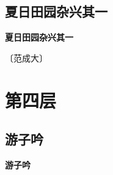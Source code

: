 \documentclass[12pt,UTF-8,openany,fontset=none]{ctexbook}
\begin{document}
\vspace{8pt}
\clearpage


\section{夏日田园杂兴其一}



\begin{center}
    {\bfseries 夏日田园杂兴其一}
\end{center}

\begin{center}
    \vspace{10pt}
    
    \begin{large}
        
        〔范成大〕
        
    \end{large}
    
    \vspace{8pt}
    
    \begin{huge}
        
        \phantom{。}

        \phantom{。}
        
        \phantom{。}

        \phantom{。}
        
    \end{huge}
    
\end{center}

\vspace{8pt}
\clearpage

\chapter{第四层}
\clearpage


\section{游子吟}



\begin{center}
    {\bfseries 游子吟}
\end{center}
\end{document}
